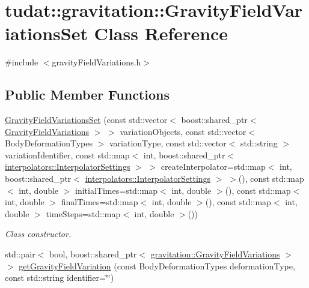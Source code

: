 \hypertarget{classtudat_1_1gravitation_1_1GravityFieldVariationsSet}{}\section{tudat\+:\+:gravitation\+:\+:Gravity\+Field\+Variations\+Set Class Reference}
\label{classtudat_1_1gravitation_1_1GravityFieldVariationsSet}


{\ttfamily \#include $<$gravity\+Field\+Variations.\+h$>$}

\subsection*{Public Member Functions}
\begin{DoxyCompactItemize}
\item 
\hyperlink{classtudat_1_1gravitation_1_1GravityFieldVariationsSet_a36795e6b1bbba8e453d732c4ea32bddc}{Gravity\+Field\+Variations\+Set} (const std\+::vector$<$ boost\+::shared\+\_\+ptr$<$ \hyperlink{classtudat_1_1gravitation_1_1GravityFieldVariations}{Gravity\+Field\+Variations} $>$ $>$ variation\+Objects, const std\+::vector$<$ Body\+Deformation\+Types $>$ variation\+Type, const std\+::vector$<$ std\+::string $>$ variation\+Identifier, const std\+::map$<$ int, boost\+::shared\+\_\+ptr$<$ \hyperlink{classtudat_1_1interpolators_1_1InterpolatorSettings}{interpolators\+::\+Interpolator\+Settings} $>$ $>$ create\+Interpolator=std\+::map$<$ int, boost\+::shared\+\_\+ptr$<$ \hyperlink{classtudat_1_1interpolators_1_1InterpolatorSettings}{interpolators\+::\+Interpolator\+Settings} $>$ $>$(), const std\+::map$<$ int, double $>$ initial\+Times=std\+::map$<$ int, double $>$(), const std\+::map$<$ int, double $>$ final\+Times=std\+::map$<$ int, double $>$(), const std\+::map$<$ int, double $>$ time\+Steps=std\+::map$<$ int, double $>$())
\begin{DoxyCompactList}\small\item\em Class constructor. \end{DoxyCompactList}\item 
std\+::pair$<$ bool, boost\+::shared\+\_\+ptr$<$ \hyperlink{classtudat_1_1gravitation_1_1GravityFieldVariations}{gravitation\+::\+Gravity\+Field\+Variations} $>$ $>$ \hyperlink{classtudat_1_1gravitation_1_1GravityFieldVariationsSet_a3d04dc05f82e1007921a7ed25e6640b9}{get\+Gravity\+Field\+Variation} (const Body\+Deformation\+Types deformation\+Type, const std\+::string identifier=\char`\"{}\char`\"{})

\end{DoxyCompactItemize}
